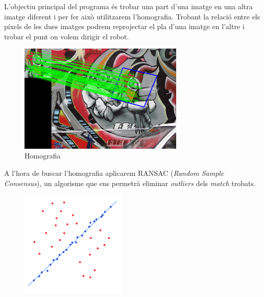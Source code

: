 	L'objectiu principal del programa és trobar una part d'una imatge en una altra imatge diferent i per fer això utilitzarem l'homografia. Trobant la relació entre els píxels de les dues imatges podrem
	reprojectar el pla d'una imatge en l'altre i trobar el punt on volem dirigir el robot.\\
	\begin{figure}[H]
		\centering
		\includegraphics[width=0.7\textwidth]{images/homography}
		\caption{Homografia}
	\end{figure}
	\noindent
	A l'hora de buscar l'homografia aplicarem RANSAC (\textit{Random Sample Consensus})\cite{Fischler:1981:RSC:358669.358692}, un algorisme que ens permetrà eliminar \textit{outliers} dels \textit{match} trobats.\\
	\begin{figure}[H]
		\centering
		\includegraphics[width=0.45\textwidth]{images/ransac}
	\end{figure}
